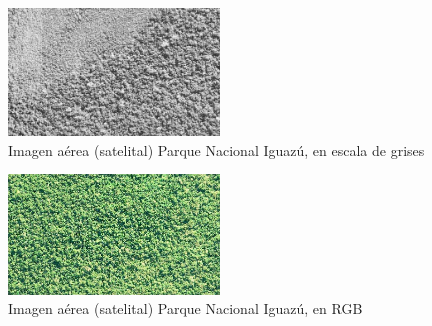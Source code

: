 \begin{figure}[h!]
    \includegraphics[width=0.5\textwidth]{Imagenes/Homomorfico/PNI1gris.jpg}
     \hfill
     \caption{Imagen aérea (satelital) Parque Nacional Iguazú, en escala de grises}
\end{figure}



\begin{figure}[h!]
    \includegraphics[width=0.5\textwidth]{Imagenes/Homomorfico/PNI2_original.jpg}
     \hfill
     \caption{Imagen aérea (satelital) Parque Nacional Iguazú, en RGB}
\end{figure}

